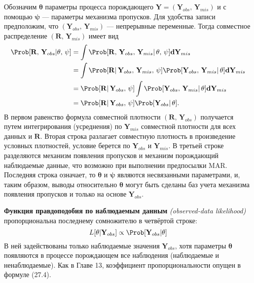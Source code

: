 Обозначим $\mathbf{\theta}$ параметры процесса порождающего $\mathbf{Y}=(\mathbf{Y}_{obs}, \, \mathbf{Y}_{mis})$ и с помощью $\mathbf{\psi}$ --- параметры механизма пропусков. Для удобства записи предположим, что $(\mathbf{Y}_{obs}, \, \mathbf{Y}_{mis})$ --– непрерывные переменные. Тогда совместное распределение $(\mathbf{R}, \, \mathbf{Y}_{mis})$ имеет вид 
\begin{align}
\Prob[\mathbf{R}, \, \mathbf{Y}_{obs} | \mathbf{\theta}, \, \mathbf{\psi}] &= \int \Prob[\mathbf{R}, \, \mathbf{Y}_{obs}, \, \mathbf{Y}_{mis}| \, \mathbf{\theta}, \, \mathbf{\psi}]\mathbf{dY}_{mis} \\
&= \int \Prob[\mathbf{R}| \, \mathbf{Y}_{obs}, \, \mathbf{Y}_{mis}, \, \mathbf{\psi}] \Prob[\mathbf{Y}_{obs}, \, \mathbf{Y}_{mis}| \, \mathbf{\theta}]\mathbf{dY}_{mis} \notag \\
&= \Prob[\mathbf{R}| \, \mathbf{Y}_{obs}, \, \mathbf{\psi}] \int \Prob [\mathbf{Y}_{obs}, \, \mathbf{Y}_{mis}| \, \mathbf{\theta}]\mathbf{dY}_{mis} \notag \\
&=\Prob[\mathbf{R}| \, \mathbf{Y}_{obs}, \, \mathbf{\psi}] \Prob[\mathbf{Y}_{obs}| \, \mathbf{\theta}]. \notag
\end{align}
В первом равенство  формула совместной плотности $(\mathbf{R}, \, \mathbf{Y}_{obs})$ получается путем интегрирования (усреднения) по $\mathbf{Y}_{mis}$ совместной плотности для всех данных и $\mathbf{R}$. Вторая строка разлагает совместную плотность в произведение условных плотностей, условие берется по $\mathbf{Y}_{obs}$ и $\mathbf{Y}_{mis}$. В третьей строке разделяются механизм появления пропусков и механизм порождающий наблюдаемые данные, что возможно при выполнении предпосылки MAR. Последняя строка означает, то $\mathbf{\theta}$ и $\mathbf{\psi}$ являются несвязанными параметрами, и, таким образом, выводы относительно $\mathbf{\theta}$ могут быть сделаны баз учета механизма появления пропусков и только на основе $\mathbf{Y}_{obs}$. 

{\bf Функция правдоподобия по наблюдаемым данным} \emph{(observed-data likelihood)} пропорциональна последнему сомножителю в четвёртой строке:
\begin{equation}
L[\mathbf{\theta}|\mathbf{Y}_{obs}] \propto \Prob[\mathbf{Y}_{obs}|\mathbf{\theta}]
\end{equation}
В ней задействованы только наблюдаемые значения $\mathbf{Y}_{obs}$, хотя параметры $\mathbf{\theta}$ появляются в процессе порождающем  все наблюдения (наблюдаемые и ненаблюдаемые). Как в Главе 13, коэффициент пропорциональности опущен в формуле (27.4).

